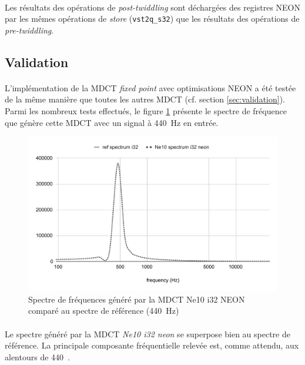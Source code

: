 \documentclass{article}
\begin{document}
    \paragraph{}
    Les résultats des opérations de \emph{post-twiddling} sont déchargées des registres NEON par les mêmes opérations de \emph{store} (\texttt{vst2q\_s32}) que les résultats des opérations de \emph{pre-twiddling}.


    \subsection{Validation}

    \paragraph{}
    L'implémentation de la MDCT \emph{fixed point} avec optimisations NEON a été testée de la même manière que toutes les autres MDCT (cf. section \ref{sec:validation}). Parmi les nombreux tests effectués, le figure \ref{fig:validation_ne10_i32_neon} présente le spectre de fréquence que génère cette MDCT avec un signal à \SI{440}{\hertz} en entrée.
    \begin{figure}[H]
        \centering
        \includegraphics[width=.8\linewidth]{./images/validation_ne10_i32_neon.pdf}
        \caption{Spectre de fréquences généré par la MDCT Ne10 i32 NEON comparé au spectre de référence (\SI{440}{\hertz})}
        \label{fig:validation_ne10_i32_neon}
    \end{figure}

    \paragraph{}
    Le spectre généré par la MDCT \emph{Ne10 i32 neon} se superpose bien au spectre de référence. La principale composante fréquentielle relevée est, comme attendu, aux alentours de \SI{440}{\hertz.}
\end{document}
